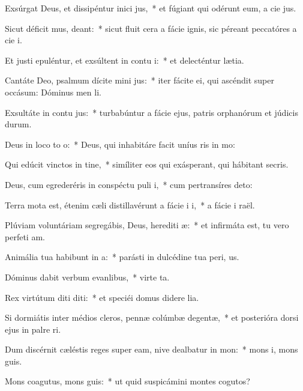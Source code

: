 \item Exsúrgat Deus, et dissipéntur inici jus,~* et fúgiant qui odérunt eum, a cie jus.
\item Sicut déficit mus, deant:~* sicut fluit cera a fácie ignis, sic péreant peccatóres a cie i.
\item Et justi epuléntur, et exsúltent in contu i:~* et delecténtur  lætia.
\item Cantáte Deo, psalmum dícite mini jus:~* iter fácite ei, qui ascéndit super occásum: Dóminus men li.
\item Exsultáte in contu jus:~* turbabúntur a fácie ejus, patris orphanórum et júdicis durum.
\item Deus in loco to o:~* Deus, qui inhabitáre facit uníus ris in mo:
\item Qui edúcit vinctos in tine,~* simíliter eos qui exásperant, qui hábitant  secris.
\item Deus, cum egrederéris in conspéctu puli i,~* cum pertransíres  deto:
\item Terra mota est, étenim cæli distillavérunt a fácie i i,~* a fácie i raël.
\item Plúviam voluntáriam segregábis, Deus, herediti æ:~* et infirmáta est, tu vero perfeti am.
\item Animália tua habibunt in a:~* parásti in dulcédine tua peri, us.
\item Dóminus dabit verbum evanlibus,~* virte ta.
\item Rex virtútum diti diti:~* et speciéi domus didere lia.
\item Si dormiátis inter médios cleros, pennæ colúmbæ degentæ,~* et posterióra dorsi ejus in palre ri.
\item Dum discérnit cæléstis reges super eam, nive dealbatur in mon:~* mons i, mons guis.
\item Mons coagutus, mons guis:~* ut quid suspicámini montes cogutos?
